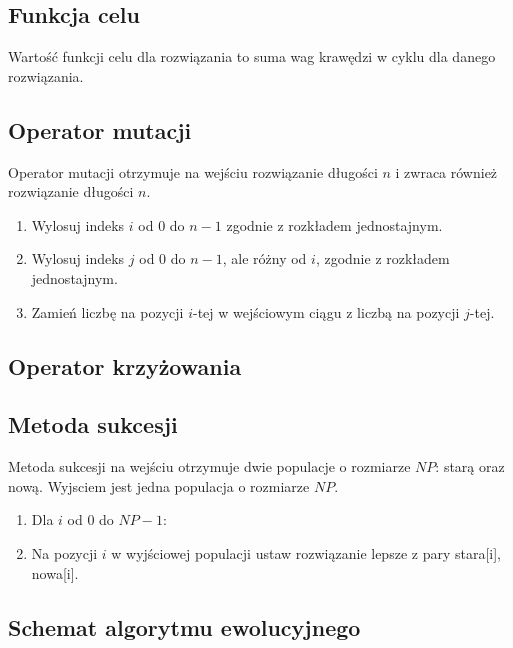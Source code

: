 \documentclass[12pt, a4paper]{article}
\begin{document}
\subsection{Funkcja celu}

Wartość funkcji celu dla rozwiązania to suma wag krawędzi w cyklu dla danego rozwiązania.

\subsection{Operator mutacji}

Operator mutacji otrzymuje na wejściu rozwiązanie długości $n$ i zwraca również rozwiązanie długości $n$.

\begin{enumerate}
 \item Wylosuj indeks $i$ od 0 do $n-1$ zgodnie z rozkładem jednostajnym.
 \item Wylosuj indeks $j$ od 0 do $n-1$, ale różny od $i$, zgodnie z rozkładem jednostajnym.
 \item Zamień liczbę na pozycji $i$-tej w wejściowym ciągu z liczbą na pozycji $j$-tej.
\end{enumerate}

\subsection{Operator krzyżowania}


\subsection{Metoda sukcesji}

Metoda sukcesji na wejściu otrzymuje dwie populacje o rozmiarze $NP$: starą oraz nową. Wyjsciem jest jedna populacja o rozmiarze $NP$.

\begin{enumerate}
 \item Dla $i$ od 0 do $NP-1$:
 \item Na pozycji $i$ w wyjściowej populacji ustaw rozwiązanie lepsze z pary stara[i], nowa[i].
\end{enumerate}

\subsection{Schemat algorytmu ewolucyjnego}


\nocite{*}


\end{document}
